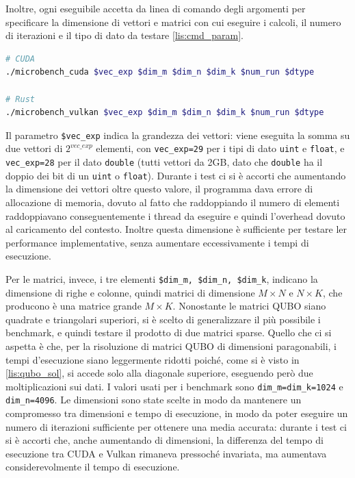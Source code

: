 Inoltre, ogni eseguibile accetta da linea di comando degli argomenti per specificare la dimensione di vettori e matrici con cui eseguire i calcoli, il numero di iterazioni e il tipo di dato da testare \ref{lis:cmd_param}.

\vspace{5mm}
\begin{lstlisting}[language=bash, caption=Esecuzione benchmark, label=lis:cmd_param]
# CUDA
./microbench_cuda $vec_exp $dim_m $dim_n $dim_k $num_run $dtype

# Rust
./microbench_vulkan $vec_exp $dim_m $dim_n $dim_k $num_run $dtype
\end{lstlisting}
\vspace{5mm}

Il parametro \verb|$vec_exp| indica la grandezza dei vettori: viene eseguita la somma su due vettori di $2^{vec\_exp}$ elementi, con \verb|vec_exp=29| per i tipi di dato \verb|uint| e \verb|float|, e \verb|vec_exp=28| per il dato \verb|double| (tutti vettori da 2GB, dato che \verb|double| ha il doppio dei bit di un \verb|uint| o \verb|float|). Durante i test ci si è accorti che aumentando la dimensione dei vettori oltre questo valore, il programma dava errore di allocazione di memoria, dovuto al fatto che raddoppiando il numero di elementi raddoppiavano conseguentemente i thread da eseguire e quindi l'overhead dovuto al caricamento del contesto. Inoltre questa dimensione è sufficiente per testare ler performance implementative, senza aumentare eccessivamente i tempi di esecuzione.

Per le matrici, invece, i tre elementi \verb|$dim_m, $dim_n, $dim_k|, indicano la dimensione di righe e colonne, quindi matrici di dimensione $M \times N$ e $N \times K$, che producono è una matrice grande $M \times K$. Nonostante le matrici \gls{QUBO} siano quadrate e triangolari superiori, si è scelto di generalizzare il più possibile i benchmark, e quindi testare il prodotto di due matrici sparse. Quello che ci si aspetta è che, per la risoluzione di matrici \gls{QUBO} di dimensioni paragonabili, i tempi d'esecuzione siano leggermente ridotti poiché, come si è visto in \ref{lis:qubo_sol}, si accede solo alla diagonale superiore, eseguendo però due moltiplicazioni sui dati. I valori usati per i benchmark sono \verb|dim_m=dim_k=1024| e \verb|dim_n=4096|. Le dimensioni sono state scelte in modo da mantenere un compromesso tra dimensioni e tempo di esecuzione, in modo da poter eseguire un numero di iterazioni sufficiente per ottenere una media accurata: durante i test ci si è accorti che, anche aumentando di dimensioni, la differenza del tempo di esecuzione tra \gls{CUDA} e Vulkan rimaneva pressoché invariata, ma aumentava considerevolmente il tempo di esecuzione.

